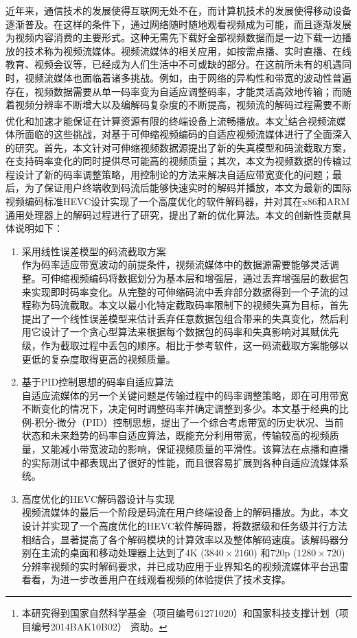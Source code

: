 \begin{cabstract}
近年来，通信技术的发展使得互联网无处不在，而计算机技术的发展使得移动设备逐渐普及。在这样的条件下，通过网络随时随地观看视频成为可能，而且逐渐发展为视频内容消费的主要形式。这种无需先下载好全部视频数据而是一边下载一边播放的技术称为视频流媒体。视频流媒体的相关应用，如按需点播、实时直播、在线教育、视频会议等，已经成为人们生活中不可或缺的部分。在这前所未有的机遇同时，视频流媒体也面临着诸多挑战。例如，由于网络的异构性和带宽的波动性普遍存在，视频数据需要从单一码率变为自适应调整码率，才能灵活高效地传输；而随着视频分辨率不断增大以及编解码复杂度的不断提高，视频流的解码过程需要不断优化和加速才能保证在计算资源有限的终端设备上流畅播放。本文\footnote{本研究得到国家自然科学基金（项目编号61271020）和国家科技支撑计划（项目编号2014BAK10B02） 资助。}结合视频流媒体所面临的这些挑战，对基于可伸缩视频编码的自适应视频流媒体进行了全面深入的研究。首先，本文针对可伸缩视频数据源提出了新的失真模型和码流截取方案，在支持码率变化的同时提供尽可能高的视频质量；其次，本文为视频数据的传输过程设计了新的码率调整策略，用控制论的方法来解决自适应带宽变化的问题；最后，为了保证用户终端收到码流后能够快速实时的解码并播放，本文为最新的国际视频编码标准HEVC设计实现了一个高度优化的软件解码器，并对其在x86和ARM通用处理器上的解码过程进行了研究，提出了新的优化算法。本文的创新性贡献具体说明如下：
\begin{enumerate}
\item {采用线性误差模型的码流截取方案}\\
作为码率适应带宽波动的前提条件，视频流媒体中的数据源需要能够灵活调整。可伸缩视频编码将数据划分为基本层和增强层，通过丢弃增强层的数据包来实现即时码率变化。从完整的可伸缩码流中丢弃部分数据得到一个子流的过程称为码流截取。本文以最小化特定截取码率限制下的视频失真为目标，首先提出了一个线性误差模型来估计丢弃任意数据包组合带来的失真变化，然后利用它设计了一个贪心型算法来根据每个数据包的码率和失真影响对其赋优先级，作为截取过程中丢包的顺序。相比于参考软件，这一码流截取方案能够以更低的复杂度取得更高的视频质量。
\item {基于PID控制思想的码率自适应算法}\\
自适应流媒体的另一个关键问题是传输过程中的码率调整策略，即在可用带宽不断变化的情况下，决定何时调整码率并确定调整到多少。本文基于经典的比例-积分-微分（PID）控制思想，提出了一个综合考虑带宽的历史状况、当前状态和未来趋势的码率自适应算法，既能充分利用带宽，传输较高的视频质量，又能减小带宽波动的影响，保证视频质量的平滑性。该算法在点播和直播的实际测试中都表现出了很好的性能，而且很容易扩展到各种自适应流媒体系统。
\item {高度优化的HEVC解码器设计与实现}\\
视频流媒体的最后一个阶段是码流在用户终端设备上的解码播放。为此，本文设计并实现了一个高度优化的HEVC软件解码器，将数据级和任务级并行方法相结合，显著提高了各个解码模块的计算效率以及整体解码速度。该解码器分别在主流的桌面和移动处理器上达到了4K ($3840 \times 2160$) 和720p ($1280 \times 720$) 分辨率视频的实时解码要求，并已成功应用于业界知名的视频流媒体平台迅雷看看，为进一步改善用户在线观看视频的体验提供了技术支撑。
\end{enumerate}
\end{cabstract}

